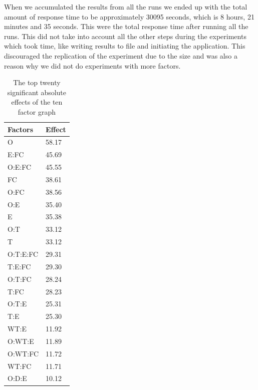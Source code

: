 \documentclass{llncs}
\begin{document}
When we accumulated the results from all the runs we ended up with the
total amount of response time to be approximately 30095 seconds, which
is 8 hours, 21 minutes and 35 seconds.  This were the total response
time after running all the runs. This did not take into account all
the other steps during the experiments which took time, like writing
results to file and initiating the application.  This discouraged the
replication of the experiment due to the size and was also a reason
why we did not do experiments with more factors.




\begin{table}
    \begin{tabular}{ | l l |}
    \hline
    {\bf Factors} & {\bf Effect}  \\ \hline
      O & 58.17 \\ \hline
      E:FC & 45.69 \\ \hline
      O:E:FC & 45.55\\ \hline
      FC & 38.61\\ \hline
      O:FC & 38.56\\ \hline
      O:E & 35.40\\ \hline
      E & 35.38\\ \hline
      O:T & 33.12\\ \hline
      T & 33.12\\ \hline
      O:T:E:FC & 29.31\\ \hline
      T:E:FC & 29.30\\ \hline
      O:T:FC & 28.24\\ \hline
      T:FC & 28.23\\ \hline
      O:T:E & 25.31\\ \hline
      T:E & 25.30\\ \hline
      WT:E & 11.92\\ \hline
      O:WT:E & 11.89\\ \hline
      O:WT:FC & 11.72\\ \hline
      WT:FC & 11.71\\ \hline
      O:D:E & 10.12\\ \hline
    \end{tabular}
\caption{The top twenty significant absolute effects of the ten factor graph}\label{10factorEffect}
\end{table}
\end{document}
